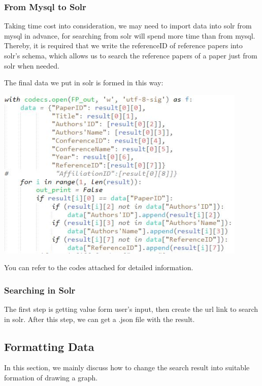 \documentclass[10pt,twoside,a4paper,titlepage]{article}
\begin{document}
		\subsubsection{From Mysql to Solr}
			\par Taking time cost into consideration, we may need to import data into solr from mysql in advance, for searching from solr will spend more time than from mysql. Thereby, it is required that we write the referenceID of reference papers into solr's schema, which allows us to search the reference papers of a paper just from solr when needed.
			\par The final data we put in solr is formed in this way:\newline\par
			\includegraphics[width=0.9\textwidth]{gjl/formdata.jpg}\newline\par
		You can refer to the codes attached for detailed information.
		\subsubsection{Searching in Solr}
			\par The first step is getting value form user's input, then create the url link to search in solr. After this step, we can get a .json file with the result.

	\subsection{Formatting Data}
		\par In this section, we mainly discuss how to change the search result into suitable formation of drawing a graph. 
\end{document}
